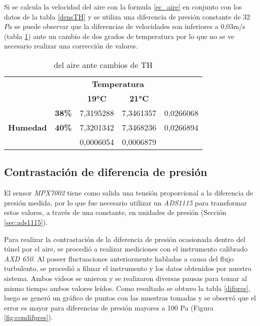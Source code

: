 Si se calcula la velocidad del aire con la formula \ref{ec_aire} en conjunto con los datos de la tabla \ref{densTH} y se utiliza una diferencia de presión constante de 32$Pa$ se puede observar que la diferencias de velocidades son inferiores a 0,03m/s (tabla \ref{velTH}) ante un cambio de dos grados de temperatura por lo que no se ve necesario realizar una corrección de valores.

\begin{table}[h!]
	\centering
	\begin{tabular}{lllll}
		&  & \multicolumn{2}{c}{\textbf{Temperatura}} &  \\
		&  & \multicolumn{1}{c}{\textbf{19°C}} & \multicolumn{1}{c}{\textbf{21°C}} & \multicolumn{1}{c}{\textbf{}} \\
		\multicolumn{1}{c}{} & \multicolumn{1}{r}{\textbf{38\%}} & 7,3195288 & 7,3461357 & \cellcolor[HTML]{F2F2F2}0,0266068 \\
		\multicolumn{1}{c}{\multirow{-2}{*}{\textbf{Humedad}}} & \multicolumn{1}{r}{\textbf{40\%}} & 7,3201342 & 7,3468236 & \cellcolor[HTML]{F2F2F2}0,0266894 \\
		& \multicolumn{1}{c}{\textbf{}} & \cellcolor[HTML]{F2F2F2}0,0006054 & \cellcolor[HTML]{F2F2F2}0,0006879 & 
	\end{tabular}
\caption{del aire ante cambios de TH}
\label{velTH}
\end{table}

\subsection{Contrastación de diferencia de presión}

El sensor \textit{MPX7002} tiene como salida una tensión proporcional a la diferencia de presión medida, por lo que fue necesario utilizar un \textit{ADS1115} para transformar estos valores, a través de una constante, en unidades de presión (Sección \ref{sec:ads1115}).

Para realizar la contrastación de la diferencia de presión ocasionada dentro del túnel por el aire, se procedió a realizar mediciones con el instrumento calibrado \textit{AXD 650}. Al poseer fluctuaciones anteriormente habladas a causa del flujo turbulento, se procedió a filmar el instrumento y los datos obtenidos por nuestro sistema. Ambos videos se unieron y se realizaron diversas pausas para tomar al mismo tiempo ambos valores leídos. Como resultado se obtuvo la tabla \ref{difpres}, luego se generó un gráfico de puntos con las muestras tomadas y se observó que el error es mayor para diferencias de presión mayores a 100 Pa (Figura \ref{fig:condifpres}).

